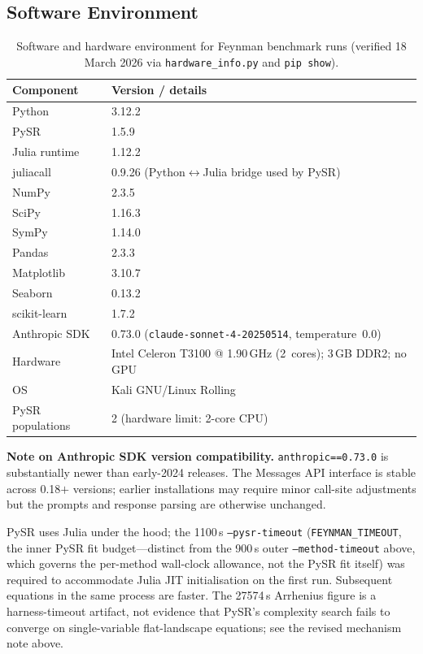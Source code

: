 \documentclass[twoside,11pt]{article}
\begin{document}
\subsection*{Software Environment}

\begin{table}[H]
\centering
\caption{Software and hardware environment for Feynman benchmark runs
         (verified 18 March 2026 via \texttt{hardware\_info.py} and
         \texttt{pip show}).}
\label{tab:software_env}
\small
\begin{tabular}{ll}
\toprule
\textbf{Component} & \textbf{Version / details} \\
\midrule
Python           & 3.12.2 \\
PySR             & 1.5.9 \\
Julia runtime    & 1.12.2 \\
juliacall        & 0.9.26 (Python$\leftrightarrow$Julia bridge used by PySR) \\
NumPy            & 2.3.5 \\
SciPy            & 1.16.3 \\
SymPy            & 1.14.0 \\
Pandas           & 2.3.3 \\
Matplotlib       & 3.10.7 \\
Seaborn          & 0.13.2 \\
scikit-learn     & 1.7.2 \\
Anthropic SDK    & 0.73.0 (\texttt{claude-sonnet-4-20250514},
                   temperature~0.0) \\
\midrule
Hardware         & Intel Celeron T3100 @ 1.90\,GHz (2~cores);
                   3\,GB DDR2; no GPU \\
OS               & Kali GNU/Linux Rolling \\
PySR populations & 2 (hardware limit: 2-core CPU) \\
\bottomrule
\end{tabular}
\end{table}

\noindent\textbf{Note on Anthropic SDK version compatibility.}
\texttt{anthropic==0.73.0} is substantially newer than early-2024 releases.
The Messages API interface is stable across 0.18$+$ versions; earlier
installations may require minor call-site adjustments but the prompts and
response parsing are otherwise unchanged.

\noindent PySR uses Julia under the hood; the 1100\,s
\texttt{--pysr-timeout} (\texttt{FEYNMAN\_TIMEOUT}, the inner PySR fit
budget---distinct from the 900\,s outer \texttt{--method-timeout} above,
which governs the per-method wall-clock allowance, not the PySR fit itself)
was required to accommodate Julia JIT initialisation on the first run.
Subsequent equations in the same process are faster. The 27574\,s Arrhenius
figure is a harness-timeout artifact, not evidence that PySR's complexity
search fails to converge on single-variable flat-landscape equations; see
the revised mechanism note above.
\end{document}
